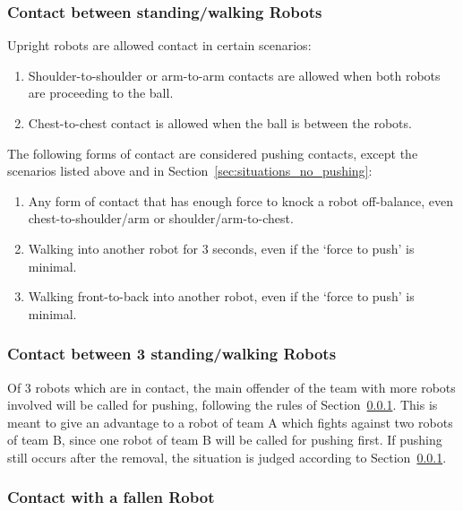 \documentclass[12pt]{article}
\begin{document}
\subsubsection{Contact between standing/walking Robots}
\label{sec:pushing_contact}

Upright robots are allowed contact in certain scenarios:
\begin{enumerate}
	\item Shoulder-to-shoulder or arm-to-arm contacts are allowed when both robots are proceeding to the ball.
	\item Chest-to-chest contact is allowed when the ball is between the robots.
\end{enumerate}

The following forms of contact are considered pushing contacts, except the scenarios listed above and in Section~\ref{sec:situations_no_pushing}:
\begin{enumerate}
	\item Any form of contact that has enough force to knock a robot off-balance, even chest-to-shoulder/arm or shoulder/arm-to-chest.
	\item Walking into another robot for 3 seconds, even if the `force to push' is minimal.
	\item Walking front-to-back into another robot, even if the `force to push' is minimal.
\end{enumerate}


\subsubsection{Contact between 3 standing/walking Robots}
\label{sec:pushing_3_robots}

Of 3 robots which are in contact, the main offender of the team with more robots involved will be called for pushing, following the rules of Section~\ref{sec:pushing_contact}.
This is meant to give an advantage to a robot of team A which fights against two robots of team B, since one robot of team B will be called for pushing first. If pushing still occurs after the removal, the situation is judged according to Section~\ref{sec:pushing_contact}.


\subsubsection{Contact with a fallen Robot}
\label{sec:pushing_fallen}
\end{document}
